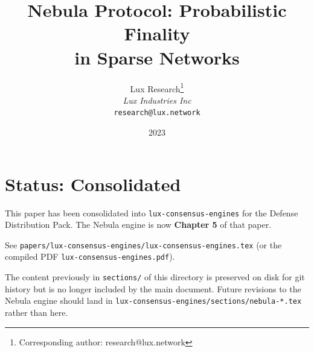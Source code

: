\documentclass[11pt,a4paper]{article}
\title{\textbf{Nebula Protocol: Probabilistic Finality\\in Sparse Networks}}
\author{
Lux Research\thanks{Corresponding author: research@lux.network}\\
\textit{Lux Industries Inc}\\
\texttt{research@lux.network}
}
\date{2023}
\begin{document}
\luxcoverpage

\section*{Status: Consolidated}

This paper has been consolidated into \texttt{lux-consensus-engines} for the
Defense Distribution Pack. The Nebula engine is now \textbf{Chapter 5} of that paper.

See \texttt{papers/lux-consensus-engines/lux-consensus-engines.tex} (or the
compiled PDF \texttt{lux-consensus-engines.pdf}).

The content previously in \texttt{sections/} of this directory is preserved on
disk for git history but is no longer included by the main document. Future
revisions to the Nebula engine should land in
\texttt{lux-consensus-engines/sections/nebula-*.tex} rather than here.
\end{document}
